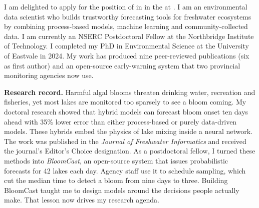 \begin{coverletter}[
]


I am delighted to apply for the position of \PositionTitle in
\PositionField in the \Department at \Institution. I am an
environmental data scientist who builds trustworthy forecasting tools for
freshwater ecosystems by combining process-based models, machine learning
and community-collected data. I am currently an NSERC Postdoctoral Fellow at
the Northbridge Institute of Technology. I completed my PhD in Environmental
Science at the University of Eastvale in 2024. My work has produced nine
peer-reviewed publications (six as first author) and an open-source
early-warning system that two provincial monitoring agencies now use.

\textbf{Research record.} Harmful algal blooms threaten drinking water,
recreation and fisheries, yet most lakes are monitored too sparsely to see a
bloom coming. My doctoral research showed that hybrid models can forecast bloom
onset ten days ahead with 35\% lower error than either process-based or
purely data-driven models. These hybrids embed the physics of lake mixing
inside a neural network. The work was published in the \emph{Journal of
Freshwater Informatics} and received the journal's Editor's Choice
designation. As a postdoctoral fellow, I turned these methods into
\emph{BloomCast}, an open-source system that issues probabilistic forecasts
for 42 lakes each day. Agency staff use it to schedule sampling, which
cut the median time to detect a bloom from nine days to three. Building
BloomCast taught me to design models around the decisions people actually
make. That lesson now drives my research agenda.


\end{coverletter}
